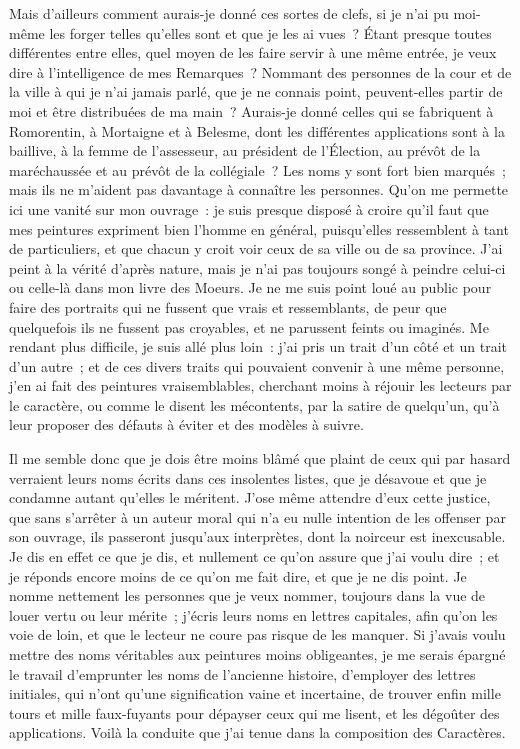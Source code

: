 \documentclass[french,twoside]{book} %
\begin{document}
Mais d’ailleurs comment aurais-je donné ces sortes de clefs, si je n’ai pu moi-même les forger telles qu’elles sont et que je les ai vues ? Étant presque toutes différentes entre elles, quel moyen de les faire servir à une même entrée, je veux dire à l’intelligence de mes Remarques ? Nommant des personnes de la cour et de la ville à qui je n’ai jamais parlé, que je ne connais point, peuvent-elles partir de moi et être distribuées de ma main ? Aurais-je donné celles qui se fabriquent à Romorentin, à Mortaigne et à Belesme, dont les différentes applications sont à la baillive, à la femme de l’assesseur, au président de l’Élection, au prévôt de la maréchaussée et au prévôt de la collégiale ? Les noms y sont fort bien marqués ; mais ils ne m’aident pas davantage à connaître les personnes. Qu'on me permette ici une vanité sur mon ouvrage : je suis presque disposé à croire qu’il faut que mes peintures expriment bien l’homme en général, puisqu’elles ressemblent à tant de particuliers, et que chacun y croit voir ceux de sa ville ou de sa province. J'ai peint à la vérité d’après nature, mais je n’ai pas toujours songé à peindre celui-ci ou celle-là dans mon livre des Moeurs. Je ne me suis point loué au public pour faire des portraits qui ne fussent que vrais et ressemblants, de peur que quelquefois ils ne fussent pas croyables, et ne parussent feints ou imaginés. Me rendant plus difficile, je suis allé plus loin : j’ai pris un trait d’un côté et un trait d’un autre ; et de ces divers traits qui pouvaient convenir à une même personne, j’en ai fait des peintures vraisemblables, cherchant moins à réjouir les lecteurs par le caractère, ou comme le disent les mécontents, par la satire de quelqu’un, qu’à leur proposer des défauts à éviter et des modèles à suivre.\par
Il me semble donc que je dois être moins blâmé que plaint de ceux qui par hasard verraient leurs noms écrits dans ces insolentes listes, que je désavoue et que je condamne autant qu’elles le méritent. J'ose même attendre d’eux cette justice, que sans s’arrêter à un auteur moral qui n’a eu nulle intention de les offenser par son ouvrage, ils passeront jusqu’aux interprètes, dont la noirceur est inexcusable. Je dis en effet ce que je dis, et nullement ce qu’on assure que j’ai voulu dire ; et je réponds encore moins de ce qu’on me fait dire, et que je ne dis point. Je nomme nettement les personnes que je veux nommer, toujours dans la vue de louer vertu ou leur mérite ; j’écris leurs noms en lettres capitales, afin qu’on les voie de loin, et que le lecteur ne coure pas risque de les manquer. Si j’avais voulu mettre des noms véritables aux peintures moins obligeantes, je me serais épargné le travail d’emprunter les noms de l’ancienne histoire, d’employer des lettres initiales, qui n’ont qu’une signification vaine et incertaine, de trouver enfin mille tours et mille faux-fuyants pour dépayser ceux qui me lisent, et les dégoûter des applications. Voilà la conduite que j’ai tenue dans la composition des Caractères.\par
\end{document}
